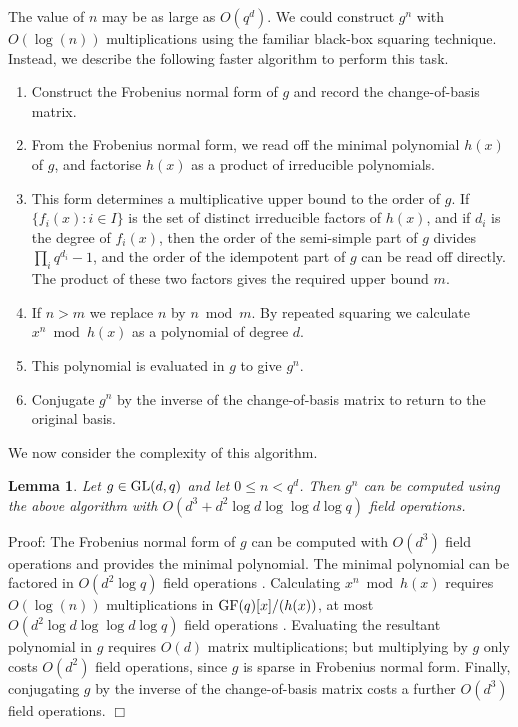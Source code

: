 \documentclass[12pt]{article}
\newtheorem{lemma}[definition]{Lemma}
\newenvironment{proof}{\normalsize {\sc Proof}:}{{\hfill $\Box$ \\}}
\def\GL{{\rm GL}}
\def\GF{{\rm GF}}
\begin{document}
The value of $n$ may be as large as $O(q^d)$. We
could construct $g^n$ with $O(\log(n))$ multiplications using the familiar
black-box squaring technique. 
Instead, we describe the following faster algorithm to perform this task.
\begin{enumerate}
\item 
Construct the Frobenius normal form of $g$ and record
the change-of-basis matrix. 

\item 
 From the Frobenius normal form, 
we read off the minimal polynomial
$h(x)$ of $g$, and factorise $h(x)$ 
as a product of irreducible polynomials.

\item 
This form determines a multiplicative upper bound
to the order of $g$. 
If $\{f_i(x):i\in I\}$ is the set of distinct
irreducible factors of $h(x)$, and if $d_i$ is the degree of
$f_i(x)$, then the order of the semi-simple part of $g$ divides
$\prod_iq^{d_i}-1$, and the order of the idempotent part of $g$ can be
read off directly. The product of these two factors  gives the
required upper bound $m$. 

\item If $n>m$ we replace $n$ by $n\bmod m$. 
By repeated squaring we calculate $x^n\bmod h(x)$ 
as a polynomial of degree $d$. 

\item This polynomial is evaluated in $g$ to give $g^n$. 

\item Conjugate $g^n$ by the inverse of the change-of-basis 
matrix to return to the original basis.
\end{enumerate}

We now consider the complexity of this algorithm.
\begin{lemma}\label{compute-power}
Let $g\in\GL(d,q)$ and let $0\le n<q^d$. Then
$g^n$ can be computed using the above algorithm
with $O(d^3 + d^2 \log d \log \log d \log q)$ field operations.
\end{lemma}
\begin{proof}
The Frobenius normal form of $g$ can be computed with
$O(d^3)$ field operations \cite{Storjohann98}
and provides the minimal polynomial.
The minimal polynomial can be factored in 
$O(d^2 \log q)$ field operations \cite[Theorem 14.14]{vzg}.
Calculating $x^n \bmod h(x)$ requires $O(\log(n))$
multiplications in $\GF(q)[x]/(h(x))$, 
at most $O(d^2 \log d \log \log d \log q)$ 
field operations \cite{vzg}. Evaluating the resultant polynomial in $g$ requires
$O(d)$ matrix multiplications;  but multiplying by   
$g$ only costs $O(d^2)$ field operations, since $g$ is sparse 
in Frobenius normal form. Finally, conjugating $g$ by the inverse of 
the change-of-basis matrix costs a further $O(d^3)$ field operations.
\end{proof}
\end{document}
